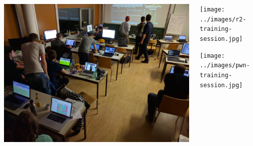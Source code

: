 \begin{frame}[plain]

  \vspace{12em}

  \begin{columns}[T]
    \begin{column}{.6\textwidth}
      \begin{rotate}{-5}
        \includegraphics[width=\textwidth]{../images/ructfe2016-hacking.jpg}
      \end{rotate}
    \end{column}
    \begin{column}{.4\textwidth}
      \begin{rotate}{5}
        \texttt{[image: ../images/r2-training-session.jpg]}
      \end{rotate}

      \vspace{7em}

      \begin{rotate}{-7}
        \texttt{[image: ../images/pwn-training-session.jpg]}
      \end{rotate}
    \end{column}
  \end{columns}
\end{frame}

